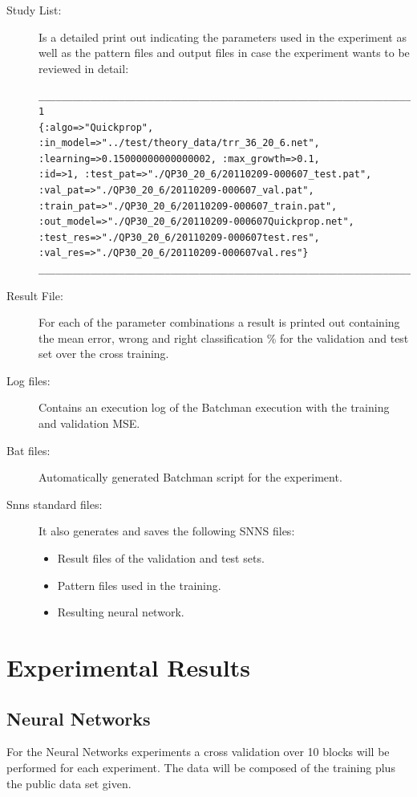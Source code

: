 \documentclass[a4paper,10pt,titlepage]{article}
\begin{document}
\begin{description}
	\item[Study List:] Is a detailed print out indicating the parameters used in the experiment as well as the pattern files and output files in case the experiment wants to be reviewed in detail:
	{\footnotesize\begin{verbatim}
______________________________________________________________________________________
1
{:algo=>"Quickprop", :in_model=>"../test/theory_data/trr_36_20_6.net", :learning=>0.15000000000000002, :max_growth=>0.1, 
:id=>1, :test_pat=>"./QP30_20_6/20110209-000607_test.pat", :val_pat=>"./QP30_20_6/20110209-000607_val.pat", 
:train_pat=>"./QP30_20_6/20110209-000607_train.pat", :out_model=>"./QP30_20_6/20110209-000607Quickprop.net", 
:test_res=>"./QP30_20_6/20110209-000607test.res", :val_res=>"./QP30_20_6/20110209-000607val.res"}
______________________________________________________________________________________
	\end{verbatim}}
	
	\item[Result File:] For each of the parameter combinations a result is printed out containing the mean error, wrong and right classification \% for the validation and test set over the cross training.
	\item[Log files:] Contains an execution log of the Batchman execution with the training and validation MSE.
	\item[Bat files:] Automatically generated Batchman script for the experiment.
	\item[Snns standard files:] It also generates and saves the following SNNS files:
	\begin{itemize}
		\item Result files of the validation and test sets.
		\item Pattern files used in the training.
		\item Resulting neural network.
	\end{itemize}
\end{description}


\section{Experimental Results}
\subsection{Neural Networks}

\par For the Neural Networks experiments a cross validation over 10 blocks will be performed for each experiment. The data will be composed of the training plus the public data set given.
\end{document}
